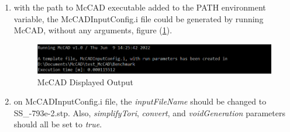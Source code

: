 \documentclass[12pt, a4paper, titlepage]{article}
\begin{document}
\begin{enumerate}
  \item with the path to McCAD executable added to the PATH environment variable, the McCADInputConfig.i file could be generated by running McCAD, without any arguments, figure (\ref{fig:McCAD_output}).
  \begin{figure}[h!]
  	\centering
  	\includegraphics[scale=0.7]{figures/McCAD_output.png}
  	\caption{McCAD Displayed Output}
  	\label{fig:McCAD_output}
  \end{figure}

  \item on McCADInputConfig.i file, the \emph{inputFileName} should be changed to SS\_-793e-2.stp. Also, \emph{simplifyTori}, \emph{convert}, and \emph{voidGeneration} parameters should all be set to \emph{true}.
  

\end{enumerate}
\end{document}
